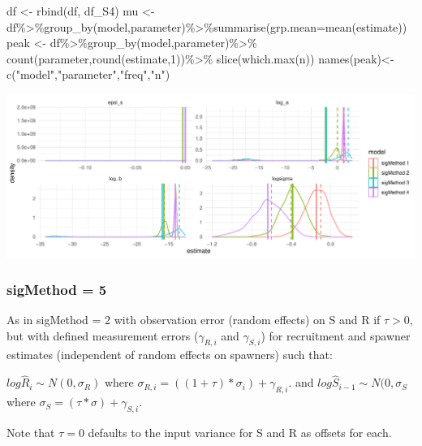 \documentclass[
]{article}
\newenvironment{Shaded}{\begin{snugshade}}{\end{snugshade}}
\newcommand{\AttributeTok}[1]{\textcolor[rgb]{0.77,0.63,0.00}{#1}}
\newcommand{\DecValTok}[1]{\textcolor[rgb]{0.00,0.00,0.81}{#1}}
\newcommand{\FunctionTok}[1]{\textcolor[rgb]{0.00,0.00,0.00}{#1}}
\newcommand{\NormalTok}[1]{#1}
\newcommand{\OtherTok}[1]{\textcolor[rgb]{0.56,0.35,0.01}{#1}}
\newcommand{\SpecialCharTok}[1]{\textcolor[rgb]{0.00,0.00,0.00}{#1}}
\newcommand{\StringTok}[1]{\textcolor[rgb]{0.31,0.60,0.02}{#1}}
\begin{document}
\begin{Shaded}
\begin{Highlighting}[]
\NormalTok{  df }\OtherTok{\textless{}{-}} \FunctionTok{rbind}\NormalTok{(df, df\_S4)}
\NormalTok{  mu   }\OtherTok{\textless{}{-}}\NormalTok{ df}\SpecialCharTok{\%\textgreater{}\%}\FunctionTok{group\_by}\NormalTok{(model,parameter)}\SpecialCharTok{\%\textgreater{}\%}\FunctionTok{summarise}\NormalTok{(}\AttributeTok{grp.mean=}\FunctionTok{mean}\NormalTok{(estimate))}
\NormalTok{  peak }\OtherTok{\textless{}{-}}\NormalTok{ df}\SpecialCharTok{\%\textgreater{}\%}\FunctionTok{group\_by}\NormalTok{(model,parameter)}\SpecialCharTok{\%\textgreater{}\%}
    \FunctionTok{count}\NormalTok{(parameter,}\FunctionTok{round}\NormalTok{(estimate,}\DecValTok{1}\NormalTok{))}\SpecialCharTok{\%\textgreater{}\%}
    \FunctionTok{slice}\NormalTok{(}\FunctionTok{which.max}\NormalTok{(n))}
  \FunctionTok{names}\NormalTok{(peak)}\OtherTok{\textless{}{-}} \FunctionTok{c}\NormalTok{(}\StringTok{"model"}\NormalTok{,}\StringTok{"parameter"}\NormalTok{,}\StringTok{"freq"}\NormalTok{,}\StringTok{"n"}\NormalTok{)}
\end{Highlighting}
\end{Shaded}

\includegraphics{futR_demo_files/figure-latex/plot4-1.pdf}

\hypertarget{sigmethod-5-1}{%
\subsubsection{sigMethod = 5}\label{sigmethod-5-1}}

As in sigMethod = 2 with observation error (random effects) on S and R
if \(\tau >0\), but with defined measurement errors (\(\gamma_{R,i}\)
and \(\gamma_{S,i}\)) for recruitment and spawner estimates (independent
of random effects on spawners) such that:

\(log\hat{R}_i\sim N(0,\sigma_R)\) where
\(\sigma_{R,i}=((1+\tau)*\sigma_i)+\gamma_{R,i}\). and
\(log\hat{S}_{i-1} \sim N(0,\sigma_S\) where
\(\sigma_S=(\tau*\sigma)+\gamma_{S,i}\).

Note that \(\tau = 0\) defaults to the input variance for S and R as
offsets for each.
\end{document}
